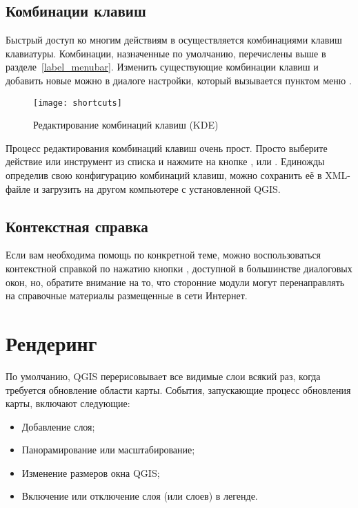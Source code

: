 \subsection{Комбинации клавиш}\label{shortcuts}

Быстрый доступ ко многим действиям в \qg осуществляется комбинациями клавиш
клавиатуры. Комбинации, назначенные по умолчанию, перечислены выше в разделе~\ref{label_menubar}.
Изменить существующие комбинации клавиш и добавить новые можно в диалоге настройки,
который вызывается пунктом меню  \arrow
{}.

\begin{figure}[ht]
   \centering
   \texttt{[image: shortcuts]}
   \caption{Редактирование комбинаций клавиш \nixcaption (KDE)} \label{fig:shortcuts}
\end{figure}

Процесс редактирования комбинаций клавиш очень прост. Просто выберите
действие или инструмент из списка и нажмите на кнопке ,
 или . Единожды определив свою
конфигурацию комбинаций клавиш, можно сохранить её в XML-файле и загрузить
на другом компьютере с установленной QGIS.

\subsection{Контекстная справка}\label{context_help}

Если вам необходима помощь по конкретной теме, можно воспользоваться
контекстной справкой по нажатию кнопки , доступной в
большинстве диалоговых окон, но, обратите внимание на то, что сторонние
модули могут перенаправлять на справочные материалы размещенные в сети
Интернет.

\section{Рендеринг}\label{subsec:redraw_events}

По умолчанию, QGIS перерисовывает все видимые слои всякий раз, когда
требуется обновление области карты. События, запускающие
процесс обновления карты, включают следующие:

\begin{itemize}
\item Добавление слоя;
\item Панорамирование или масштабирование;
\item Изменение размеров окна QGIS;
\item Включение или отключение слоя (или слоев) в легенде.
\end{itemize}

